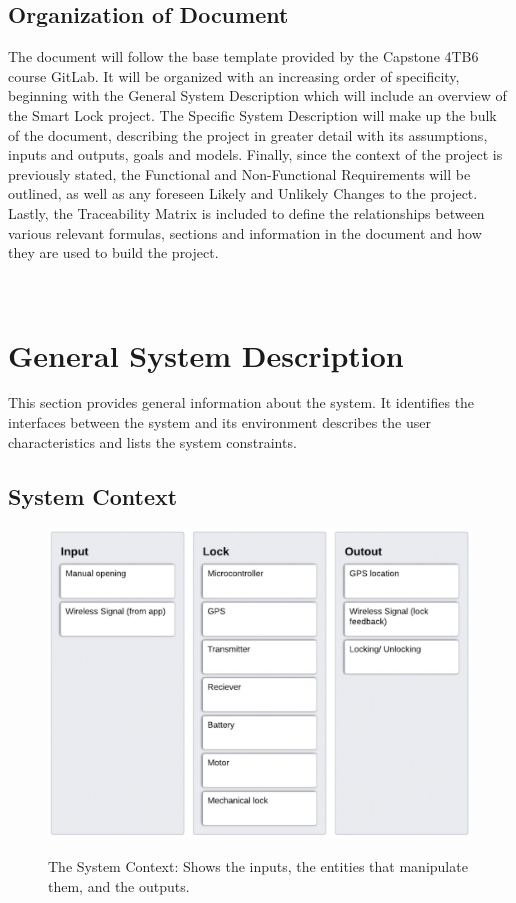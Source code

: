 \documentclass[12pt]{article}
\begin{document}
\subsection{Organization of Document}

The document will follow the base template provided by the Capstone 4TB6 course GitLab. It will be organized with an increasing order of specificity, beginning with the General System Description which will include an overview of the Smart Lock project. The Specific System Description will make up the bulk of the document, describing the project in greater detail with its assumptions, inputs and outputs, goals and models. Finally, since the context of the project is previously stated, the Functional and Non-Functional Requirements will be outlined, as well as any foreseen Likely and Unlikely Changes to the project. Lastly, the Traceability Matrix is included to define the relationships between various relevant formulas, sections and information in the document and how they are used to build the project.  

~\newpage

\section{General System Description}

This section provides general information about the system.  It identifies the
interfaces between the system and its environment describes the user
characteristics and lists the system constraints.  


\subsection{System Context}

 \begin{figure}[h!]
 \begin{center}
 {
  \includegraphics[width=0.6\linewidth]{../SystemContextDiagram.jpeg}
 }
 \caption{\label{The System Context}The System Context: Shows the inputs, the entities that manipulate them, and the outputs.}
 \end{center}
 \end{figure}
\end{document}
